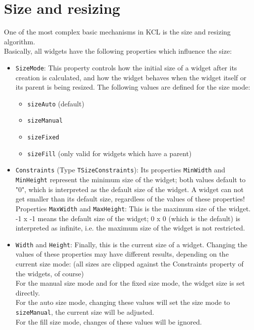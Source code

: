 \section{Size and resizing}
One of the most complex basic mechanisms in KCL is the size and resizing
algorithm.
\\ Basically, all widgets have the following properties which influence the
size:
\begin{itemize}
\item \texttt{SizeMode}: This property controls how the initial size of a widget
      after its creation is calculated, and how the widget behaves when the
      widget itself or its parent is being resized. The following values are
      defined for the size mode:
      \begin{itemize}
      \item \texttt{sizeAuto} (default)
      \item \texttt{sizeManual}
      \item \texttt{sizeFixed}
      \item \texttt{sizeFill} (only valid for widgets which have a parent)
      \end{itemize}
\item \texttt{Constraints} (Type \texttt{TSizeConstraints}): Its properties
      \texttt{MinWidth} and \texttt{MinHeight} represent the minimum size of the
      widget; both values default to "0", which is interpreted as the default
      size of the widget.
      A widget can not get smaller than its default size, regardless of the
      values of these properties!
      \\ Properties \texttt{MaxWidth} and \texttt{MaxHeight}: This is the
      maximum size of the widget. -1 x -1 means the default size of the widget;
      0 x 0 (which is the default) is interpreted as infinite, i.e. the maximum
      size of the widget is not restricted.
\item \texttt{Width} and \texttt{Height}: Finally, this is the current size of
      a widget. Changing the values of these properties may have different
      results, depending on the current size mode: (all sizes are clipped
      against the Constraints property of the widgets, of course)
      \\ For the manual size mode and for the fixed size mode, the widget size
         is set directly.
      \\ For the auto size mode, changing these values will set the size mode
         to \texttt{sizeManual}, the current size will be adjusted.
      \\ For the fill size mode, changes of these values will be ignored.
\end{itemize}
